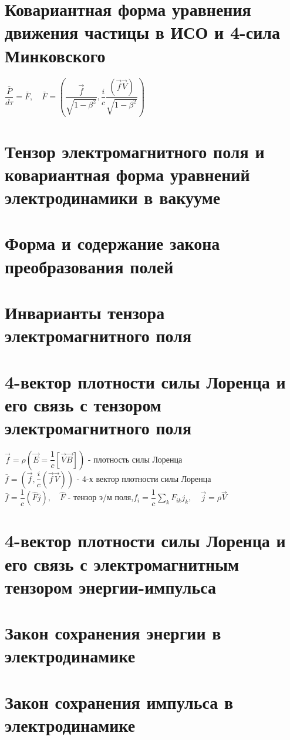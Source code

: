 \begin{multicols*}{2}
		\section{Ковариантная форма уравнения движения частицы в ИСО и 4-сила Минковского}
		$\dfrac{\bar{P}}{d\tau} = \bar{F},\quad \bar{F} = (\dfrac{\vec{f}}{\sqrt{1-\beta^2}}, \dfrac{i}{c}\dfrac{(\vec{f}\vec{V})}{\sqrt{1-\beta^2}})$
		
		\section{Тензор электромагнитного поля и ковариантная форма уравнений электродинамики в вакууме}
		
		\section{Форма и содержание закона преобразования полей}
		
		\section{Инварианты тензора электромагнитного поля}
		
		\section{4-вектор плотности силы Лоренца и его связь с тензором электромагнитного поля}
		$\vec{f} = \rho (\vec{E} = \dfrac{1}{c}\left[\vec{V}\vec{B}\right])$ - плотность силы Лоренца\\
		$\bar{f} = (\vec{f}, \dfrac{i}{c}(\vec{f}\vec{V}))$ - 4-х вектор плотности силы Лоренца\\
		$\bar{f} = \dfrac{1}{c}(\hat{F}\bar{j}), \quad \hat{F}$ - тензор э/м поля,\quad $f_i = \dfrac{1}{c}\sum_{k}^{}F_{ik}j_k, \quad \vec{j} = \rho \vec{V}$
		
		\section{4-вектор плотности силы Лоренца и его связь с электромагнитным тензором энергии-импульса}
		
		\section{Закон сохранения энергии в электродинамике}
		
		\section{Закон сохранения импульса в электродинамике}
		

\end{multicols*}
